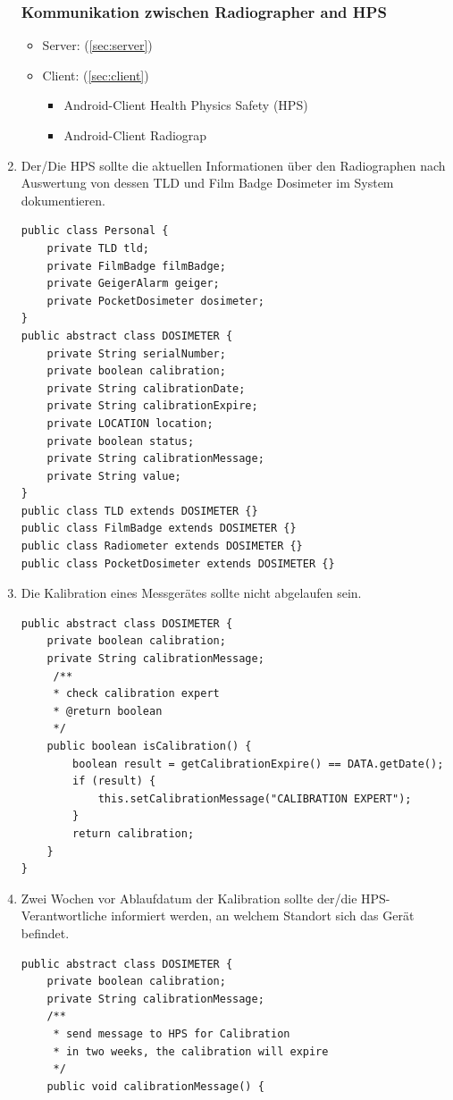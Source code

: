\begin{enumerate}
\subsubsection{Kommunikation zwischen Radiographer and HPS}
\begin{itemize}
\item Server: (\ref{sec:server})
\item Client: (\ref{sec:client})
\begin{itemize}
\item  Android-Client Health Physics Safety (HPS)
\item  Android-Client Radiograp
\end{itemize}
\end{itemize} 
\item Der/Die HPS sollte die aktuellen Informationen über den Radiographen 
nach Auswertung von dessen TLD und Film Badge Dosimeter im System dokumentieren.
\begin{lstlisting}[frame=single]
public class Personal {
    private TLD tld;
    private FilmBadge filmBadge;
    private GeigerAlarm geiger;
    private PocketDosimeter dosimeter;
}
public abstract class DOSIMETER {
    private String serialNumber;
    private boolean calibration;
    private String calibrationDate;
    private String calibrationExpire;
    private LOCATION location;
    private boolean status;
    private String calibrationMessage;
    private String value;
}
public class TLD extends DOSIMETER {}
public class FilmBadge extends DOSIMETER {}
public class Radiometer extends DOSIMETER {}
public class PocketDosimeter extends DOSIMETER {}
\end{lstlisting}
\item Die Kalibration eines Messgerätes sollte nicht abgelaufen sein.
\begin{lstlisting}[frame=single]
public abstract class DOSIMETER {
    private boolean calibration;
    private String calibrationMessage;
     /**
     * check calibration expert
     * @return boolean
     */
    public boolean isCalibration() {
        boolean result = getCalibrationExpire() == DATA.getDate();
        if (result) {
            this.setCalibrationMessage("CALIBRATION EXPERT");
        }
        return calibration;
    }
}
\end{lstlisting}
\item Zwei Wochen vor Ablaufdatum der Kalibration sollte der/die HPS-Verantwortliche informiert
werden, an welchem Standort sich das Gerät befindet.
\begin{lstlisting}[frame=single]
public abstract class DOSIMETER {
    private boolean calibration;
    private String calibrationMessage;
    /**
     * send message to HPS for Calibration
     * in two weeks, the calibration will expire
     */
    public void calibrationMessage() {


\end{lstlisting}
\end{enumerate}
